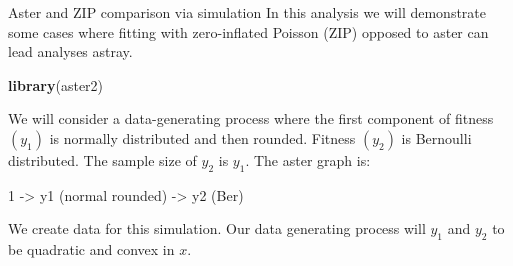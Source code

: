\documentclass[
  ignorenonframetext,
]{beamer}
\newenvironment{Shaded}{\begin{snugshade}}{\end{snugshade}}
\newcommand{\FunctionTok}[1]{\textcolor[rgb]{0.13,0.29,0.53}{\textbf{#1}}}
\newcommand{\NormalTok}[1]{#1}
\begin{document}
\begin{frame}[fragile]{Aster and ZIP comparison via simulation}
\protect\hypertarget{aster-and-zip-comparison-via-simulation}{}
In this analysis we will demonstrate some cases where fitting with
zero-inflated Poisson (ZIP) opposed to aster can lead analyses astray.

\vspace{5pt}

\begin{Shaded}
\begin{Highlighting}[]
\FunctionTok{library}\NormalTok{(aster2)}
\end{Highlighting}
\end{Shaded}
\end{frame}

\begin{frame}{}
\protect\hypertarget{section-56}{}
We will consider a data-generating process where the first component of
fitness \((y_1)\) is normally distributed and then rounded. Fitness
\((y_2)\) is Bernoulli distributed. The sample size of \(y_2\) is
\(y_1\). The aster graph is:

\begin{center}
1 -> y1 (normal rounded) -> y2 (Ber)
\end{center}

We create data for this simulation. Our data generating process will
\(y_1\) and \(y_2\) to be quadratic and convex in \(x\).
\end{frame}
\end{document}
